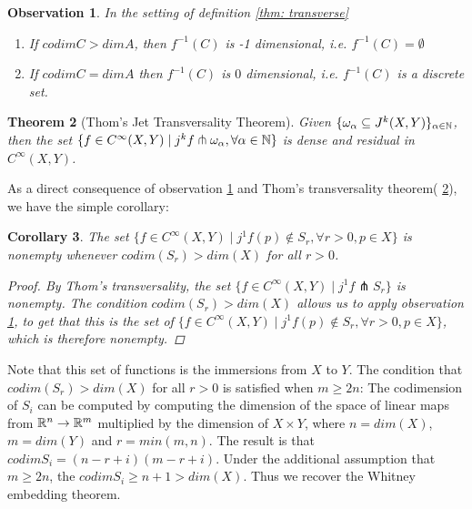 \documentclass{article}
\newtheorem{theorem}{Theorem}[section]
\newtheorem{corollary}[theorem]{Corollary}
\newtheorem{proposed work}[theorem]{Proposed Work}
\newtheorem{observation}[theorem]{Observation}
\theoremstyle{definition}
\begin{document}
\begin{observation}\label{thm: dimensioncounting}
In the setting of definition \ref{thm: transverse}
\begin{enumerate}
\item If $codim C > dim A $, then $f^{-1}(C)$ is -1 dimensional, i.e. $f^{-1}(C)= \emptyset$
\item If $codim C  = dim A$ then $f^{-1}(C)$ is $0$ dimensional, i.e. $f^{-1}(C)$ is a discrete set.
\end{enumerate}
\end{observation}

\begin{theorem}[Thom's Jet Transversality Theorem]\label{thm: thomJT}
Given $\{\omega_\alpha \subseteq J^k(X,Y)\}_{\alpha \in \mathbb N}$, then the set $\{f \in C^\infty(X,Y) \mid j^kf \pitchfork \omega_\alpha, \forall \alpha \in \mathbb N\}$ is dense and residual in $C^\infty(X,Y)$.
\end{theorem}


As a direct consequence of observation \ref{thm: dimensioncounting} and Thom's transversality theorem( \ref{thm: thomJT}), we have the simple corollary:

\begin{corollary}\label{thm:jettransimm}
The set $\{f \in C^\infty(X,Y) \mid j^1f(p) \notin  S_r, \forall r>0, p \in X \}$ is nonempty whenever $codim(S_r) > dim(X)$ for all $r>0$. 
\begin{proof}
By Thom's transversality, the set $\{ f \in C^\infty(X,Y) \mid j^1f  \pitchfork S_r \}$ is nonempty.  The condition $codim(S_r) > dim(X)$ allows us to apply observation \ref{thm: dimensioncounting}, to get that this is the set of $\{f \in C^\infty(X,Y) \mid j^1f(p) \notin  S_r, \forall r>0, p \in X \}$, which is therefore nonempty.
\end{proof}

\end{corollary}
Note that this set of functions is the immersions from $X$ to $Y$.  The condition that $codim(S_r) > dim(X)$ for all $r>0$ is satisfied when $m \geq 2n$:
The codimension of $S_i$ can be computed by computing the dimension of the space of linear maps \label{howcomputedimension} from $\mathbb R^n \to \mathbb R^m$ multiplied by the dimension of $X \times Y$, where $n=dim(X)$, $m=dim(Y)$ and $r=min(m,n)$.  The result is that $codim S_i=(n-r+i)(m-r+i)$. Under the additional assumption that $m \geq 2n$, the $codim S_i \geq n+1> dim(X)$.  Thus we recover the Whitney embedding theorem.
\end{document}
